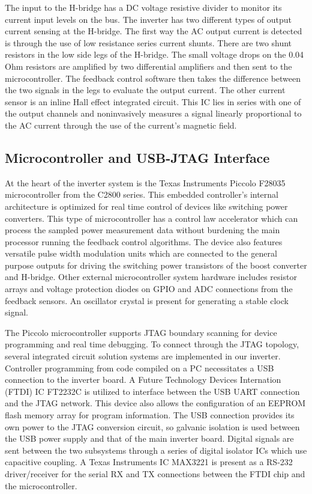 The input to the H-bridge has a DC voltage resistive divider to monitor its current input levels on the bus. The inverter has two different types of output current sensing at the H-bridge. The first way the AC output current is detected is through the use of low resistance series current shunts. There are two shunt resistors in the low side legs of the H-bridge. The small voltage drops on the 0.04 Ohm resistors are amplified by two differential amplifiers and then sent to the microcontroller. The feedback control software then takes the difference between the two signals in the legs to evaluate the output current. The other current sensor is an inline Hall effect integrated circuit. This IC lies in series with one of the output channels and noninvasively measures a signal linearly proportional to the AC current through the use of the current’s magnetic field.



\subsection{Microcontroller and USB-JTAG Interface}
 At the heart of the inverter system is the Texas Instruments Piccolo F28035 microcontroller from the C2800 series. This embedded controller's internal architecture is optimized for real time control of devices like switching power converters. This type of microcontroller has a control law accelerator which can process the sampled power measurement data without burdening the main processor running the feedback control algorithms. The device also features versatile pulse width modulation units which are connected to the general purpose outputs for driving the switching power transistors of the boost converter and H-bridge. Other external microcontroller system hardware includes resistor arrays and voltage protection diodes on GPIO and ADC connections from the feedback sensors. An oscillator crystal is present for generating a stable clock signal.

The Piccolo microcontroller supports JTAG boundary scanning for device programming and real time debugging. To connect through the JTAG topology, several integrated circuit solution systems are implemented in our inverter. Controller programming from code compiled on a PC necessitates a USB connection to the inverter board. A Future Technology Devices Internation (FTDI) IC FT2232C is utilized to interface between the USB UART connection and the JTAG network. This device also allows the configuration of an EEPROM flash memory array for program information. The USB connection provides its own power to the JTAG conversion circuit, so galvanic isolation is used between the USB power supply and that of the main inverter board. Digital signals are sent between the two subsystems through a series of digital isolator ICs which use capacitive coupling. A Texas Instruments IC MAX3221 is present as a RS-232 driver/receiver for the serial RX and TX connections between the FTDI chip and the microcontroller.



